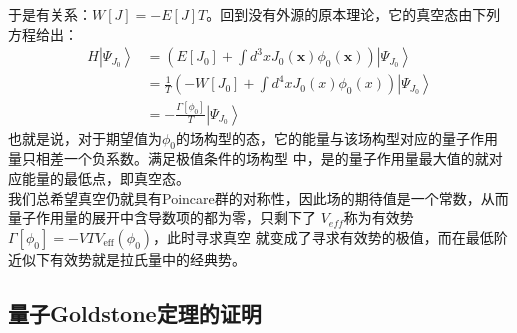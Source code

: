 \documentclass[12pt, a4paper, oneside]{ctexbook}
\begin{document}
	于是有关系：$ W[J]=-E[J] T $。回到没有外源的原本理论，它的真空态由下列方程给出：
	\begin{equation}
		\begin{aligned}
			H\left|\Psi_{J_0}\right\rangle&=\left(E[J_0]+\int d^3 x J_0(\mathbf{x}) \phi_0(\mathbf{x})\right)\left|\Psi_{J_0}\right\rangle\\
			&=\frac{1}{T}\left(-W\left[J_0\right]+\int d^4 x J_0(x) \phi_0(x)\right)\left|\Psi_{J_0}\right\rangle\\
			&=-\frac{\Gamma\left[\phi_0\right]}{T}\left|\Psi_{J_0}\right\rangle
		\end{aligned}
	\end{equation}
	也就是说，对于期望值为$ \phi_0 $的场构型的态，它的能量与该场构型对应的量子作用量只相差一个负系数。满足极值条件的场构型
	中，是的量子作用量最大值的就对应能量的最低点，即真空态。 \\

	我们总希望真空仍就具有Poincare群的对称性，因此场的期待值是一个常数，从而量子作用量的展开中含导数项的都为零，只剩下了
	$ V_{eff} $称为有效势$ \Gamma\left[\phi_0\right]=-V T V_{\mathrm{eff}}\left(\phi_0\right) $，此时寻求真空
	就变成了寻求有效势的极值，而在最低阶近似下有效势就是拉氏量中的经典势。
	\subsection{量子Goldstone定理的证明}  
\end{document}
